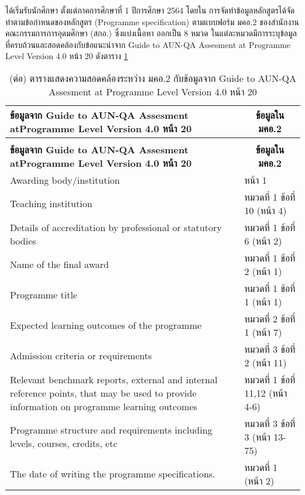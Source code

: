 \newpage
{}



\printprogram{} ได้เริ่มรับนักศึกษา
ตั้งแต่ภาคการศึกษาที่ 1 ปีการศึกษา 2564 โดยใน การจัดทำข้อมูลหลักสูตรได้จัดทำตามข้อกำหนดของหลักสูตร
(Programme specification) ตามแบบฟอร์ม มคอ.2 ของสำนักงานคณะกรรมการการอุดมศึกษา (สกอ.) ซึ่งแบ่งเนื้อหา
ออกเป็น 8 หมวด ในแต่ละหมวดมีการระบุข้อมูลที่ครบถ้วนและสอดคล้องกับข้อแนะนำจาก Guide to AUN-QA Assesment at Programme Level Version 4.0 หน้า 20 ดังตาราง \ref{Table:M2AUN}

\begin{longtable}{|p{}|p{}|}
\caption{ตารางแสดงความสอดคล้องระหว่าง มคอ.2 กับข้อมูลจาก Guide to AUN-QA Assesment at Programme Level Version 4.0 หน้า  20}
\label{Table:M2AUN}
\\
\hline
{\bf ข้อมูลจาก Guide to AUN-QA Assesment at\newline  Programme Level Version 4.0 หน้า  20}&\multicolumn{1}{c|}{\bf ข้อมูลใน มคอ.2}\\
\hline
\endfirsthead
\caption[]{(ต่อ) ตารางแสดงความสอดคล้องระหว่าง มคอ.2 กับข้อมูลจาก Guide to AUN-QA Assesment at Programme Level Version 4.0 หน้า  20}
\\
\hline
{\bf ข้อมูลจาก Guide to AUN-QA Assesment at\newline  Programme Level Version 4.0 หน้า  20}&\multicolumn{1}{c|}{\bf ข้อมูลใน มคอ.2}\\
\hline
\endhead
Awarding body/institution& หน้า 1 \\\hline
Teaching institution&หมวดที่ 1 ข้อที่ 10 (หน้า 4)\\\hline
Details of accreditation by professional or statutory bodies& หมวดที่ 1 ข้อที่ 6 (หน้า 2)\\\hline
Name of the final award&หมวดที่ 1 ข้อที่ 2 (หน้า 1)\\\hline
Programme title&หมวดที่ 1 ข้อที่ 1 (หน้า 1)\\\hline
Expected learning outcomes of the programme&หมวดที่ 2 ข้อที่ 1 (หน้า 7)\\\hline
Admission criteria or requirements&หมวดที่ 3 ข้อที่ 2 (หน้า 11)\\\hline
Relevant benchmark reports, external and internal reference points, that may
be used to provide information on programme learning outcomes&หมวดที่ 1 ข้อที่ 11,12 (หน้า 4-6)\\\hline
Programme structure and requirements including levels, courses, credits, etc&หมวดที่ 3 ข้อที่ 3 (หน้า 13-75)\\\hline
The date of writing the programme specifications.& หมวดที่ 1 (หน้า 2)\\\hline
\end{longtable}	

